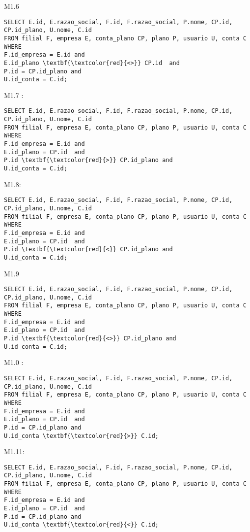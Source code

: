 M1.6
\begin{Verbatim}
SELECT E.id, E.razao_social, F.id, F.razao_social, P.nome, CP.id, CP.id_plano, U.nome, C.id
FROM filial F, empresa E, conta_plano CP, plano P, usuario U, conta C
WHERE 
F.id_empresa = E.id and
E.id_plano \textbf{\textcolor{red}{<>}} CP.id  and
P.id = CP.id_plano and
U.id_conta = C.id;
\end{Verbatim}



M1.7 :
\begin{Verbatim}
SELECT E.id, E.razao_social, F.id, F.razao_social, P.nome, CP.id, CP.id_plano, U.nome, C.id
FROM filial F, empresa E, conta_plano CP, plano P, usuario U, conta C
WHERE 
F.id_empresa = E.id and
E.id_plano = CP.id  and
P.id \textbf{\textcolor{red}{>}} CP.id_plano and
U.id_conta = C.id;
\end{Verbatim}


M1.8:
\begin{Verbatim}
SELECT E.id, E.razao_social, F.id, F.razao_social, P.nome, CP.id, CP.id_plano, U.nome, C.id
FROM filial F, empresa E, conta_plano CP, plano P, usuario U, conta C
WHERE 
F.id_empresa = E.id and
E.id_plano = CP.id  and
P.id \textbf{\textcolor{red}{<}} CP.id_plano and
U.id_conta = C.id;
\end{Verbatim}

M1.9
\begin{Verbatim}
SELECT E.id, E.razao_social, F.id, F.razao_social, P.nome, CP.id, CP.id_plano, U.nome, C.id
FROM filial F, empresa E, conta_plano CP, plano P, usuario U, conta C
WHERE 
F.id_empresa = E.id and
E.id_plano = CP.id  and
P.id \textbf{\textcolor{red}{<>}} CP.id_plano and
U.id_conta = C.id;
\end{Verbatim}


M1.0 : 
\begin{Verbatim}
SELECT E.id, E.razao_social, F.id, F.razao_social, P.nome, CP.id, CP.id_plano, U.nome, C.id
FROM filial F, empresa E, conta_plano CP, plano P, usuario U, conta C
WHERE 
F.id_empresa = E.id and
E.id_plano = CP.id  and
P.id = CP.id_plano and
U.id_conta \textbf{\textcolor{red}{>}} C.id;
\end{Verbatim}



M1.11: 
\begin{Verbatim}
SELECT E.id, E.razao_social, F.id, F.razao_social, P.nome, CP.id, CP.id_plano, U.nome, C.id
FROM filial F, empresa E, conta_plano CP, plano P, usuario U, conta C
WHERE 
F.id_empresa = E.id and
E.id_plano = CP.id  and
P.id = CP.id_plano and
U.id_conta \textbf{\textcolor{red}{<}} C.id;
\end{Verbatim}

